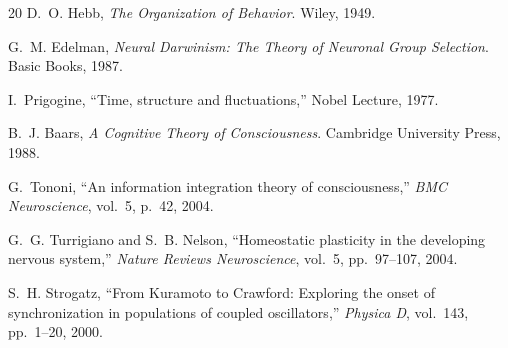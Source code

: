 \documentclass[11pt]{article}
\begin{document}
\begin{thebibliography}{20}
D.~O. Hebb, \emph{The Organization of Behavior}. Wiley, 1949.

G.~M. Edelman, \emph{Neural Darwinism: The Theory of Neuronal Group Selection}. Basic Books, 1987.

I.~Prigogine, ``Time, structure and fluctuations,'' Nobel Lecture, 1977.

B.~J. Baars, \emph{A Cognitive Theory of Consciousness}. Cambridge University Press, 1988.

G.~Tononi, ``An information integration theory of consciousness,'' \emph{BMC Neuroscience}, vol.~5, p.~42, 2004.

G.~G. Turrigiano and S.~B. Nelson, ``Homeostatic plasticity in the developing nervous system,'' \emph{Nature Reviews Neuroscience}, vol.~5, pp.~97--107, 2004.

S.~H. Strogatz, ``From Kuramoto to Crawford: Exploring the onset of synchronization in populations of coupled oscillators,'' \emph{Physica D}, vol.~143, pp.~1--20, 2000.

\end{thebibliography}
\end{document}
